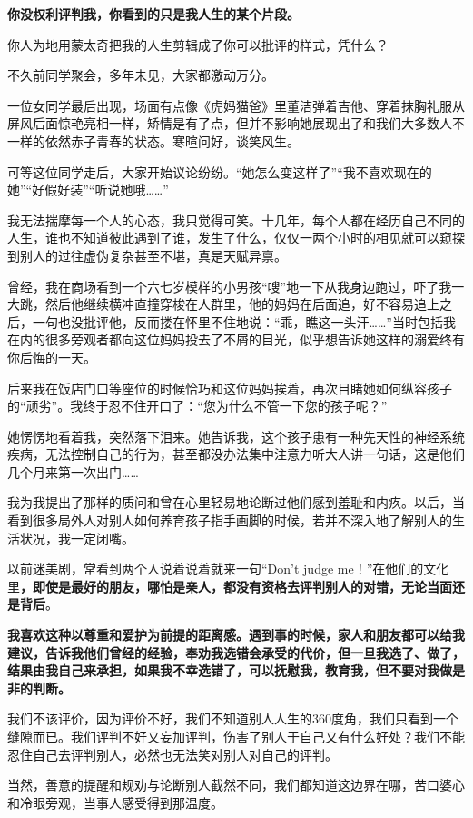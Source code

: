 \documentclass[UTF8,a4paper,8pt]{ctexart}
\begin{document}
 \textbf{你没权利评判我，你看到的只是我人生的某个片段。}
 
 你人为地用蒙太奇把我的人生剪辑成了你可以批评的样式，凭什么？
 
 不久前同学聚会，多年未见，大家都激动万分。
 
 一位女同学最后出现，场面有点像《虎妈猫爸》里董洁弹着吉他、穿着抹胸礼服从屏风后面惊艳亮相一样，矫情是有了点，但并不影响她展现出了和我们大多数人不一样的依然赤子青春的状态。寒暄问好，谈笑风生。
 
 可等这位同学走后，大家开始议论纷纷。“她怎么变这样了”“我不喜欢现在的她”“好假好装”“听说她哦……”
 
 我无法揣摩每一个人的心态，我只觉得可笑。十几年，每个人都在经历自己不同的人生，谁也不知道彼此遇到了谁，发生了什么，仅仅一两个小时的相见就可以窥探到别人的过往虚伪复杂甚至不堪，真是天赋异禀。
 
 曾经，我在商场看到一个六七岁模样的小男孩“嗖”地一下从我身边跑过，吓了我一大跳，然后他继续横冲直撞穿梭在人群里，他的妈妈在后面追，好不容易追上之后，一句也没批评他，反而搂在怀里不住地说：“乖，瞧这一头汗……”当时包括我在内的很多旁观者都向这位妈妈投去了不屑的目光，似乎想告诉她这样的溺爱终有你后悔的一天。
 
 后来我在饭店门口等座位的时候恰巧和这位妈妈挨着，再次目睹她如何纵容孩子的“顽劣”。我终于忍不住开口了：“您为什么不管一下您的孩子呢？”
 
 她愣愣地看着我，突然落下泪来。她告诉我，这个孩子患有一种先天性的神经系统疾病，无法控制自己的行为，甚至都没办法集中注意力听大人讲一句话，这是他们几个月来第一次出门……
 
 我为我提出了那样的质问和曾在心里轻易地论断过他们感到羞耻和内疚。以后，当看到很多局外人对别人如何养育孩子指手画脚的时候，若并不深入地了解别人的生活状况，我一定闭嘴。
 
 以前迷美剧，常看到两个人说着说着就来一句“Don’t judge me！”在他们的文化里\textbf{，即使是最好的朋友，哪怕是亲人，都没有资格去评判别人的对错，无论当面还是背后}。
 
 \textbf{我喜欢这种以尊重和爱护为前提的距离感。遇到事的时候，家人和朋友都可以给我建议，告诉我他们曾经的经验，奉劝我选错会承受的代价，但一旦我选了、做了，结果由我自己来承担，如果我不幸选错了，可以抚慰我，教育我，但不要对我做是非的判断。}
 
 我们不该评价，因为评价不好，我们不知道别人人生的360度角，我们只看到一个缝隙而已。我们评判不好又妄加评判，伤害了别人于自己又有什么好处？我们不能忍住自己去评判别人，必然也无法笑对别人对自己的评判。
 
 当然，善意的提醒和规劝与论断别人截然不同，我们都知道这边界在哪，苦口婆心和冷眼旁观，当事人感受得到那温度。
 
\end{document}
